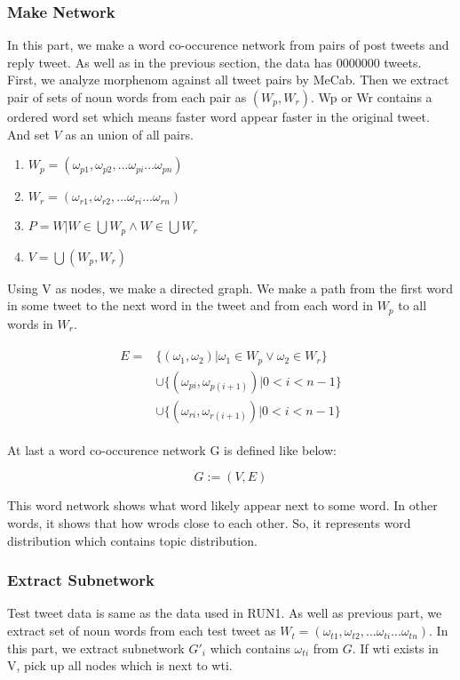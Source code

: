 \documentclass{sig-alternate}
\begin{document}
\subsubsection{Make Network}
In this part, we make a word co-occurence network from pairs of post tweets and reply tweet.
As well as in the previous section, the data has 0000000 tweets. 
First, we analyze morphenom against all tweet pairs by MeCab. Then we extract pair of sets of noun words from each pair as \((W_{p}, W_{r})\). Wp or Wr contains a ordered word set which means faster word appear faster in the original tweet. And set \(V\) as an union of all pairs.

\begin{enumerate}
    \item \(W_{p} = (\omega_{p1}, \omega_{p2}, ... \omega_{pi} ... \omega_{pn}) \)
    \item \(W_{r} = (\omega_{r1}, \omega_{r2}, ... \omega_{ri} ... \omega_{rn}) \)
    \item \(P = {W | W \in \bigcup W_{p} \wedge W \in \bigcup W_{r}}\)
    \item \(V = \bigcup (W_{p}, W_{r})\)
\end{enumerate}

Using V as nodes, we make a directed graph. We make a path from the first word in some tweet to the next word in the tweet and from each word in \( W_{p} \) to all words in \(W_{r} \).

\begin{eqnarray}
\begin{split}
E = &\{(\omega_{1}, \omega_{2}) | \omega_{1}\in W_{p} \lor \omega_{2}\in W_{r}\}\nonumber\\
&\cup \{(\omega_{pi}, \omega_{p(i+1)}) | 0 < i < n-1\}\\
&\cup \{(\omega_{ri}, \omega_{r(i+1)}) | 0 < i < n-1\}
\end{split}
\end{eqnarray}


At last a word co-occurence network G is defined like below:

\[G := (V,E)\]

This word network shows what word likely appear next to some word. In other words, it shows that how wrods close to each other. So, it represents word distribution which contains topic distribution.

\subsubsection{Extract Subnetwork}
Test tweet data is same as the data used in RUN1. As well as previous part, we extract set of noun words from each test tweet as \(W_{t} = (\omega_{t1}, \omega_{t2}, ... \omega_{ti} ... \omega_{tn})\).
In this part, we extract subnetwork $G'_{i}$ which contains \(\omega_{ti}\) from $G$.
If wti exists in V, pick up all nodes which is next to wti.
\end{document}

